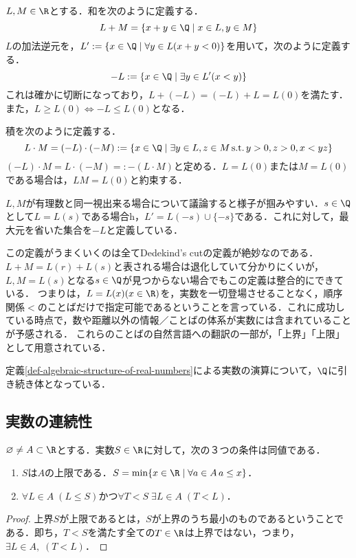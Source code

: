 \documentclass[uplatex,dvipdfmx]{jsreport}
\begin{document}
\begin{definition}[実数の演算]\label{def-algebraic-structure-of-real-numbers}
    
    $L,M\in\R$とする．和を次のように定義する．
    \[ L+M = \{ x+y\in\Q\mid x\in L, y\in M \} \]
    $L$の加法逆元を，$L':=\{x\in\Q\mid \forall y\in L (x+y<0)\}$を用いて，次のように定義する．
    \[ -L :=\{x\in\Q\mid \exists y\in L'(x<y)\} \]
    これは確かに切断になっており，$L+(-L)=(-L)+L=L(0)$を満たす．また，$L\ge L(0)\Leftrightarrow -L\le L(0)$となる．

    積を次のように定義する．
    \[ L\cdot M=(-L)\cdot (-M) := \{ x\in\Q\mid \exists y\in L, z\in M \,\mathrm{s.t.}\, y>0, z>0, x<yz \} \]
    $(-L)\cdot M=L\cdot (-M)=:-(L\cdot M)$と定める．$L=L(0)$または$M=L(0)$である場合は，$LM=L(0)$と約束する．
\end{definition}
\begin{remark}
    $L,M$が有理数と同一視出来る場合について議論すると様子が掴みやすい．$s\in\Q$として$L=L(s)$である場合h，$L'=L(-s)\cup\{-s\}$である．これに対して，最大元を省いた集合を$-L$と定義している．

    この定義がうまくいくのは全てDedekind's cutの定義が絶妙なのである．$L+M=L(r)+L(s)$と表される場合は退化していて分かりにくいが，$L,M=L(s)$となる$s\in\Q$が見つからない場合でもこの定義は整合的にできている．
    つまりは，$L=L(x)(x\in\R)$を，実数を一切登場させることなく，順序関係$<$のことばだけで指定可能であるということを言っている．これに成功している時点で，数や距離以外の情報／ことばの体系が実数には含まれていることが予感される．
    これらのことばの自然言語への翻訳の一部が，「上界」「上限」として用意されている．
\end{remark}
\begin{proposition}[実数体]
    定義\ref{def-algebraic-structure-of-real-numbers}による実数の演算について，$\Q$に引き続き体となっている．
\end{proposition}

\subsection{実数の連続性}

\begin{proposition}[上限の特徴付け]
    $\varnothing\ne A\subset\R$とする．実数$S\in\R$に対して，次の３つの条件は同値である．
    \begin{enumerate}
        \item $S$は$A$の上限である．$S=\min\{ x\in\R\mid \forall a\in A\,a\le x \}$．
        \item $\forall L\in A \;(L\le S)$かつ$\forall T<S \; \exists L\in A\; (T<L)$．
    \end{enumerate}
\end{proposition}
\begin{proof}
    上界$S$が上限であるとは，$S$が上界のうち最小のものであるということである．即ち，$T<S$を満たす全ての$T\in\R$は上界ではない，つまり，$\exists L\in A,\; (T<L)$．
\end{proof}
\end{document}
